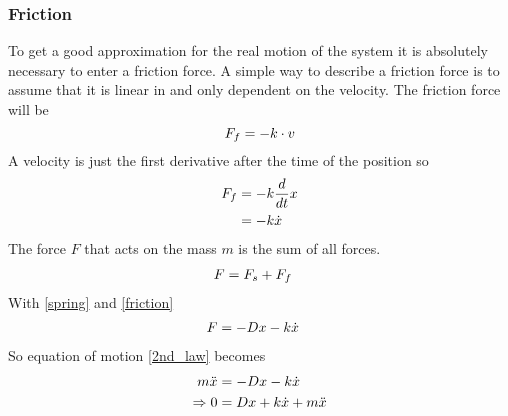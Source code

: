 \subsubsection{Friction}
To get a good approximation for the real motion of the system it is absolutely necessary to enter a friction force. A simple way to describe a friction force is to assume that it is linear in and only dependent on the velocity. The friction force will be
\begin{equation}
F_f = - k \cdot v
\notag
\end{equation}
A velocity is just the first derivative after the time of the position so
\begin{align}
F_f &= - k \frac{d}{dt} x \notag \\
 &= - k \dot x
\label{friction}
\end{align}
The force \(F\) that acts on the mass \(m\) is the sum of all forces.
\begin{align}
F &= F_s + F_f \notag 
\end{align}
With \eqref{spring} and \eqref{friction}
\begin{align}
F &= -D x - k \dot x \notag
\end{align}
So equation of motion \eqref{2nd_law} becomes
\begin{align}
m\ddot{x} &= -D x - k \dot{x} \notag\\
\Rightarrow 0 &= D x + k \dot{x} + m\ddot{x}
\label{eom}
\end{align}
